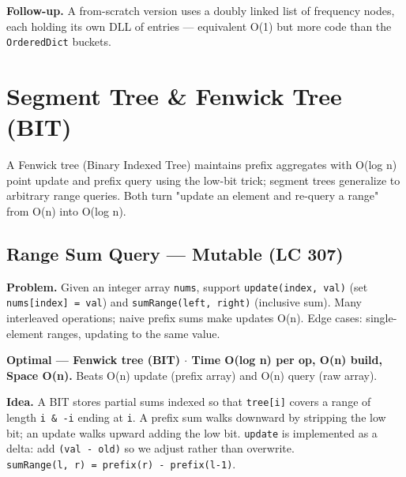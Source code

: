 \documentclass[11pt]{article}
\begin{document}
\textbf{Follow-up.} A from-scratch version uses a doubly linked list of frequency nodes, each holding its own DLL of entries --- equivalent O(1) but more code than the \texttt{OrderedDict} buckets.

\section{Segment Tree \& Fenwick Tree (BIT)}\label{segment-tree--fenwick-tree-bit}

A Fenwick tree (Binary Indexed Tree) maintains prefix aggregates with O(log n) point update and prefix query using the low-bit trick; segment trees generalize to arbitrary range queries. Both turn "update an element and re-query a range" from O(n) into O(log n).

\subsection{Range Sum Query --- Mutable (LC 307)}\label{range-sum-query--mutable-lc-307}

\textbf{Problem.} Given an integer array \texttt{nums}, support \texttt{update(index,\ val)} (set \texttt{nums{[}index{]}\ =\ val}) and \texttt{sumRange(left,\ right)} (inclusive sum). Many interleaved operations; naive prefix sums make updates O(n). Edge cases: single-element ranges, updating to the same value.

\textbf{Optimal --- Fenwick tree (BIT) \(\cdot\) Time O(log n) per op, O(n) build, Space O(n).} Beats O(n) update (prefix array) and O(n) query (raw array).

\textbf{Idea.} A BIT stores partial sums indexed so that \texttt{tree{[}i{]}} covers a range of length \texttt{i\ \&\ -i} ending at \texttt{i}. A prefix sum walks downward by stripping the low bit; an update walks upward adding the low bit. \texttt{update} is implemented as a delta: add \texttt{(val\ -\ old)} so we adjust rather than overwrite. \texttt{sumRange(l,\ r)\ =\ prefix(r)\ -\ prefix(l-1)}.

\end{document}
